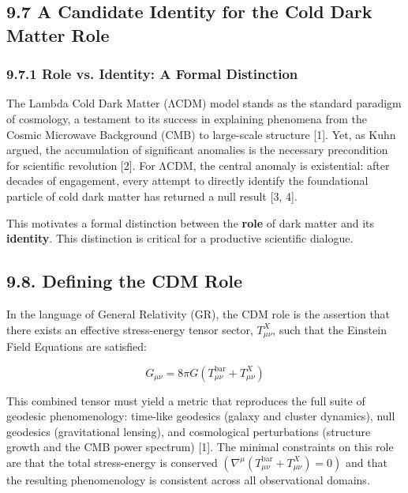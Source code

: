 \subsection{9.7 A Candidate Identity for the Cold Dark Matter Role}\label{a-candidate-identity-for-the-cold-dark-matter-role}

\subsubsection{9.7.1 Role vs. Identity: A Formal Distinction}\label{role-vs.-identity-a-formal-distinction}

The Lambda Cold Dark Matter (ΛCDM) model stands as the standard paradigm of cosmology, a testament to its success in explaining phenomena from the Cosmic Microwave Background (CMB) to large-scale structure {[}1{]}. Yet, as Kuhn argued, the accumulation of significant anomalies is the necessary precondition for scientific revolution {[}2{]}. For ΛCDM, the central anomaly is existential: after decades of engagement, every attempt to directly identify the foundational particle of cold dark matter has returned a null result {[}3, 4{]}.

This motivates a formal distinction between the \textbf{role} of dark matter and its \textbf{identity}. This distinction is critical for a productive scientific dialogue.

\subsection{9.8. Defining the CDM Role}\label{defining-the-cdm-role}

In the language of General Relativity (GR), the CDM role is the assertion that there exists an effective stress-energy tensor sector, \(T_{\mu\nu}^{X}\), such that the Einstein Field Equations are satisfied:

\[G_{\mu\nu} = 8\pi G\left( T_{\mu\nu}^{\text{bar}} + T_{\mu\nu}^{X} \right)\]

This combined tensor must yield a metric that reproduces the full suite of geodesic phenomenology: time-like geodesics (galaxy and cluster dynamics), null geodesics (gravitational lensing), and cosmological perturbations (structure growth and the CMB power spectrum) {[}1{]}. The minimal constraints on this role are that the total stress-energy is conserved \(\left( \nabla^{\mu}\left( T_{\mu\nu}^{\text{bar}} + T_{\mu\nu}^{X} \right) = 0 \right)\) and that the resulting phenomenology is consistent across all observational domains.

